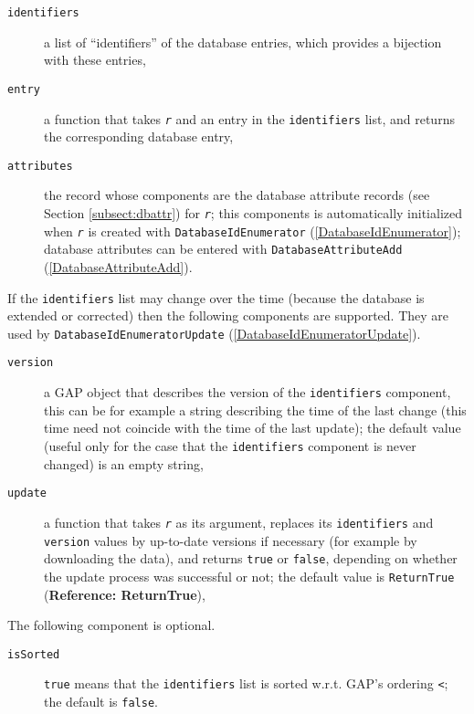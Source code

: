 \documentclass[a4paper,11pt]{report}
\begin{document}
{{{ 
\begin{description}
\item[{\texttt{identifiers}}]  a list of ``identifiers'' of the database entries, which provides a bijection with these entries, 
\item[{\texttt{entry}}]  a function that takes \mbox{\texttt{\mdseries\slshape r}} and an entry in the \texttt{identifiers} list, and returns the corresponding database entry, 
\item[{\texttt{attributes}}]  the record whose components are the database attribute records (see Section \ref{subsect:dbattr}) for \mbox{\texttt{\mdseries\slshape r}}; this components is automatically initialized when \mbox{\texttt{\mdseries\slshape r}} is created with \texttt{DatabaseIdEnumerator} (\ref{DatabaseIdEnumerator}); database attributes can be entered with \texttt{DatabaseAttributeAdd} (\ref{DatabaseAttributeAdd}). 
\end{description}
 

 If the \texttt{identifiers} list may change over the time (because the database is extended or corrected)
then the following components are supported. They are used by \texttt{DatabaseIdEnumeratorUpdate} (\ref{DatabaseIdEnumeratorUpdate}). 

 
\begin{description}
\item[{\texttt{version}}]  a \textsf{GAP} object that describes the version of the \texttt{identifiers} component, this can be for example a string describing the time of the last
change (this time need not coincide with the time of the last update); the
default value (useful only for the case that the \texttt{identifiers} component is never changed) is an empty string, 
\item[{\texttt{update}}]  a function that takes \mbox{\texttt{\mdseries\slshape r}} as its argument, replaces its \texttt{identifiers} and \texttt{version} values by up-to-date versions if necessary (for example by downloading the
data), and returns \texttt{true} or \texttt{false}, depending on whether the update process was successful or not; the default
value is \texttt{ReturnTrue} (\textbf{Reference: ReturnTrue}), 
\end{description}
 

 The following component is optional. 

 
\begin{description}
\item[{\texttt{isSorted}}]  \texttt{true} means that the \texttt{identifiers} list is sorted w.r.t. \textsf{GAP}'s ordering \texttt{\texttt{}{\textless}}; the default is \texttt{false}. 
\end{description}
 

}}}
\end{document}

